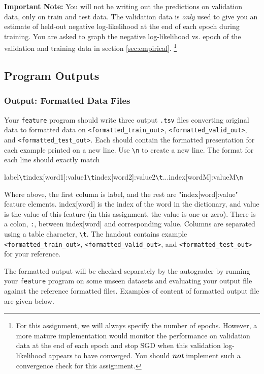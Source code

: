 \documentclass[11pt]{article}
\numberwithin{equation}{section} %
\numberwithin{figure}{section} %
\numberwithin{table}{section} %
\begin{document}
\begin{notebox}
{\bf Important Note:} You will not be writing out the predictions on validation data, only on train and test data. The validation data is \emph{only} used to give you an estimate of held-out negative log-likelihood at the end of each epoch during training. You are asked to graph the negative log-likelihood vs. epoch of the validation and training data in section \ref{sec:empirical}. \footnote{For this assignment, we will always specify the number of epochs. However, a more mature implementation would monitor the performance on validation data at the end of each epoch and stop SGD when this validation log-likelihood appears to have converged. You should \textbf{ \emph{not}} implement such a convergence check for this assignment.} 
\end{notebox}

\subsection{Program Outputs}

\subsubsection{Output: Formatted Data Files} \label{format_output}
Your \lstinline{feature} program should write three output \texttt{.tsv} files converting original data to formatted data on \texttt{<formatted\_train\_out>}, \texttt{<formatted\_valid\_out>}, and \texttt{<formatted\_test\_out>}. Each should contain the formatted presentation for each example printed on a new line. Use \lstinline{\n} to create a new line. The format for each line should exactly match 

label\lstinline{\t}index[word1]:value1\lstinline{\t}index[word2]:value2\lstinline{\t}...index[wordM]:valueM\lstinline{\n}

Where above, the first column is label, and the rest are "index[word]:value" feature elements. index[word] is the index of the word in the dictionary, and value is the value of this feature (in this assignment, the value is one or zero). There is a colon, \lstinline{:}, between index[word] and corresponding value. Columns are separated using a table character, \lstinline{\t}. The handout contains example \texttt{<formatted\_train\_out>}, \newline \texttt{<formatted\_valid\_out>}, and \texttt{<formatted\_test\_out>} for your reference.

The formatted output will be checked separately by the autograder by running your \lstinline{feature} program on some unseen datasets and evaluating your output file against the reference formatted files. Examples of content of formatted output file are given below.
\end{document}
